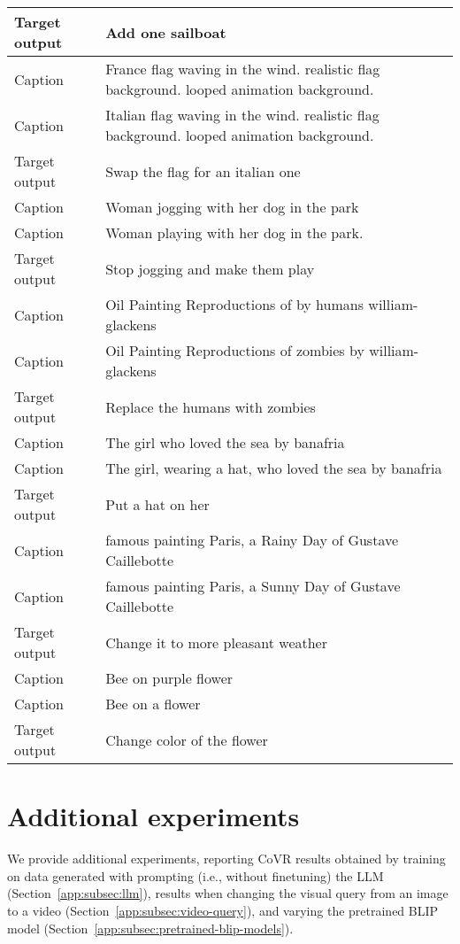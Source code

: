 \begin{table}
\begin{tabular}{ll}
Target output & Add one sailboat \\
\midrule
Caption & France flag waving in the wind. realistic flag background. looped animation background. \\
Caption & Italian flag waving in the wind. realistic flag background. looped animation background. \\
Target output & Swap the flag for an italian one \\
\midrule
Caption & Woman jogging with her dog in the park \\
Caption & Woman playing with her dog in the park. \\
Target output & Stop jogging and make them play \\
\midrule
Caption & Oil Painting Reproductions of by humans william-glackens \\
Caption & Oil Painting Reproductions of zombies by william-glackens \\
Target output & Replace the humans with zombies \\
\midrule
Caption & The girl who loved the sea by banafria \\
Caption & The girl, wearing a hat, who loved the sea by banafria \\
Target output & Put a hat on her \\
\midrule
Caption & famous painting Paris, a Rainy Day of Gustave Caillebotte \\
Caption & famous painting Paris, a Sunny Day of Gustave Caillebotte \\
Target output & Change it to more pleasant weather \\
\midrule
Caption & Bee on purple flower \\
Caption & Bee on a flower \\
Target output & Change color of the flower \\
    \bottomrule
\end{tabular}
\label{tab:added-examplges-mtg-llm}
\end{table}


 
\section{Additional experiments}
\label{app:sec:experiments}
We provide additional experiments, reporting CoVR results obtained by training on data 
generated with prompting (i.e., without finetuning) the LLM (Section~\ref{app:subsec:llm}),
results when changing the visual query from an image to a video (Section~\ref{app:subsec:video-query}),
and varying the pretrained BLIP model (Section~\ref{app:subsec:pretrained-blip-models}).

